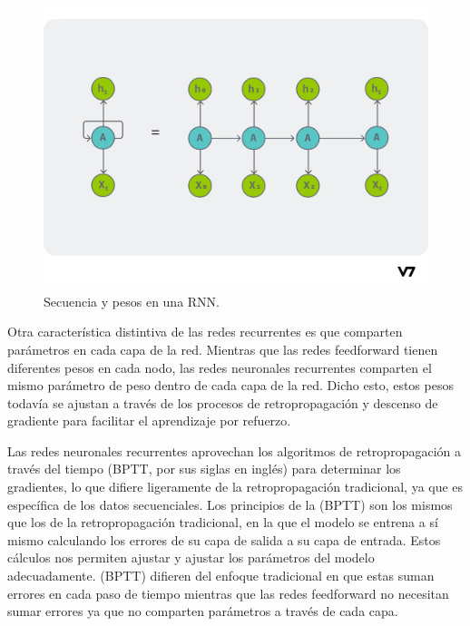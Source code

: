 \documentclass{article}
\begin{document}
\begin{figure}[H]
    \centering
    \includegraphics[scale=0.2]{secuencia.png}
    \caption{Secuencia y pesos en una RNN.}
\end{figure}

Otra característica distintiva de las redes recurrentes es que comparten parámetros en cada capa de la red.
Mientras que las redes feedforward tienen diferentes pesos en cada nodo, las redes neuronales recurrentes comparten el mismo parámetro de peso dentro de cada capa de la red.
Dicho esto, estos pesos todavía se ajustan a través de los procesos de retropropagación y descenso de gradiente para facilitar el aprendizaje por refuerzo.

\newpage

Las redes neuronales recurrentes aprovechan los algoritmos de retropropagación a través del tiempo (BPTT, por sus siglas en inglés) para determinar los gradientes, lo que difiere ligeramente de la retropropagación tradicional, ya que es específica de los datos secuenciales.
Los principios de la (BPTT) son los mismos que los de la retropropagación tradicional, en la que el modelo se entrena a sí mismo calculando los errores de su capa de salida a su capa de entrada.
Estos cálculos nos permiten ajustar y ajustar los parámetros del modelo adecuadamente.
(BPTT) difieren del enfoque tradicional en que estas suman errores en cada paso de tiempo mientras que las redes feedforward no necesitan sumar errores ya que no comparten parámetros a través de cada capa.
\end{document}
